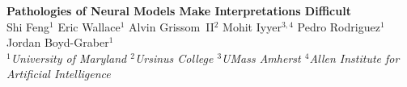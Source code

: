 \documentclass[a0,portrait]{a0poster}
\begin{document}


\begin{minipage}[b]{1\linewidth}
\centering
\veryHuge \color{blue} \textbf{Pathologies of Neural Models Make Interpretations
Difficult} \\[0.4cm]
\color{black}\LARGE
Shi Feng$^1$ Eric Wallace$^1$ Alvin Grissom~II$^2$ Mohit Iyyer$^{3,4}$ Pedro Rodriguez$^1$ Jordan Boyd-Graber$^1$\\[0.4cm]
\Large
\textit{$^1$University of Maryland $^2$Ursinus College $^3$UMass Amherst $^4$Allen Institute for Artificial Intelligence}\\
\end{minipage}

\vspace{0.6cm}
\end{document}
